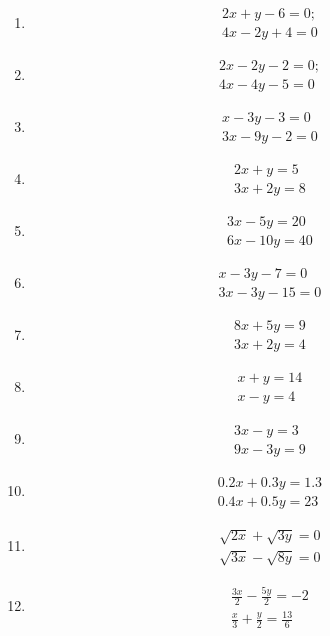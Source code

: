 \begin{enumerate}[label=\thesubsection.\arabic*,ref=\thesubsection.\theenumi]
\item \begin{align}
 	2x+y-6=0;\\
 	4x-2y+4=0
	\end{align}
\item \begin{align}
	2x-2y-2=0;\\
	4x-4y-5=0
	\end{align}
	\item \begin{align}
	x-3y-3=0\\
	3x-9y-2=0
        \end{align}
       \item \begin{align}
	2x+y=5\\
	3x+2y=8
	\end{align}
	\item \begin{align}
	3x-5y=20\\
	6x-10y=40
	\end{align}
	\item \begin{align}
	x-3y-7=0\\
	3x-3y-15=0
        \end{align}
\item \begin{align}
8x+5y=9
\\ 3x+2y=4
\end{align}
	\item
	\begin{align}
   	 x+y=14 \\x-y=4
	\end{align}
	\item
	\begin{align}
    	3x-y=3\\ 9x-3y=9
	\end{align}
\item 	\begin{align}   	
 	0.2x+0.3y=1.3\\ 0.4x+0.5y=23
	\end{align}
	\item     
	\begin{align}
	\sqrt{2x}+\sqrt{3y}=0\\ \sqrt{3x}-\sqrt{8y}=0
	\end{align}
	\item
	\begin{align}
    	\frac{3x}{2}-\frac{5y}{2}=-2\\ \frac{x}{3}+\frac{y}{2}=\frac{13}{6}

\end{align}
\end{enumerate}
